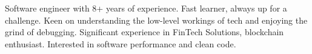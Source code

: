 

\vspace{0mm}
\begin{justify}
  Software engineer with 8+ years of experience.\newline
  Fast learner, always up for a challenge. Keen on understanding the low-level workings of tech and enjoying the grind of debugging.\newline
  Significant experience in FinTech Solutions, blockchain enthusiast. Interested in software performance and clean code.
\end{justify}
\vspace{0mm}